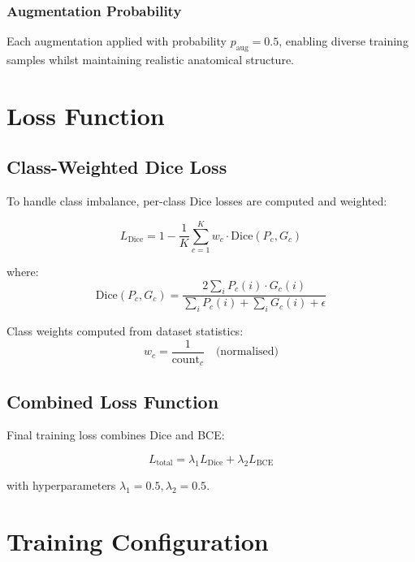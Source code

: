 \documentclass{ecsproject}     %
\begin{document}
\subsubsection{Augmentation Probability}

Each augmentation applied with probability $p_{\text{aug}} = 0.5$, enabling diverse training samples whilst maintaining realistic anatomical structure.

\section{Loss Function}

\subsection{Class-Weighted Dice Loss}

To handle class imbalance, per-class Dice losses are computed and weighted:

\begin{equation}
L_{\text{Dice}} = 1 - \frac{1}{K} \sum_{c=1}^{K} w_c \cdot \text{Dice}(P_c, G_c)
\end{equation}

where:
\begin{equation}
\text{Dice}(P_c, G_c) = \frac{2 \sum_i P_c(i) \cdot G_c(i)}{\sum_i P_c(i) + \sum_i G_c(i) + \epsilon}
\end{equation}

Class weights computed from dataset statistics:
\begin{equation}
w_c = \frac{1}{\text{count}_c} \quad \text{(normalised)}
\end{equation}

\subsection{Combined Loss Function}

Final training loss combines Dice and BCE:

\begin{equation}
L_{\text{total}} = \lambda_1 L_{\text{Dice}} + \lambda_2 L_{\text{BCE}}
\end{equation}

with hyperparameters $\lambda_1 = 0.5, \lambda_2 = 0.5$.

\section{Training Configuration}
\end{document}
